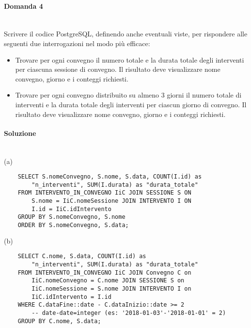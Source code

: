\documentclass[a4paper, 10pt, titlepage]{article}
\begin{document}
\paragraph{Domanda 4}\dotfill
\\Scrivere il codice PostgreSQL, definendo anche eventuali viste, per rispondere alle seguenti due interrogazioni nel modo più efficace:
\begin{itemize}
\item[(a)] Trovare per ogni convegno il numero totale e la durata totale degli interventi per ciascuna sessione di convegno. Il risultato deve visualizzare nome convegno, giorno e i conteggi richiesti.
\item[(b)] Trovare per ogni convegno distribuito su almeno 3 giorni il numero totale di interventi e la durata totale degli interventi per ciascun giorno di convegno. Il risultato deve visualizzare nome convegno, giorno e i conteggi richiesti.
\end{itemize}

\paragraph{Soluzione}\dotfill
\\(a)
\lstset{language=SQL}
\begin{lstlisting}
	SELECT S.nomeConvegno, S.nome, S.data, COUNT(I.id) as 
		"n_interventi", SUM(I.durata) as "durata_totale"
	FROM INTERVENTO_IN_CONVEGNO IiC JOIN SESSIONE S ON
		S.nome = IiC.nomeSessione JOIN INTERVENTO I ON
		I.id = IiC.idIntervento
	GROUP BY S.nomeConvegno, S.nome
	ORDER BY S.nomeConvegno, S.data;
\end{lstlisting}
(b)
\begin{lstlisting}
	SELECT C.nome, S.data, COUNT(I.id) as
		"n_interventi", SUM(I.durata) as "durata_totale"
	FROM INTERVENTO_IN_CONVEGNO IiC JOIN Convegno C on
  		IiC.nomeConvegno = C.nome JOIN SESSIONE S on
  		IiC.nomeSessione = S.nome JOIN INTERVENTO I on
  		IiC.idIntervento = I.id
	WHERE C.dataFine::date - C.dataInizio::date >= 2
		-- date-date=integer (es: '2018-01-03'-'2018-01-01' = 2)
	GROUP BY C.nome, S.data;
\end{lstlisting}
\end{document}
